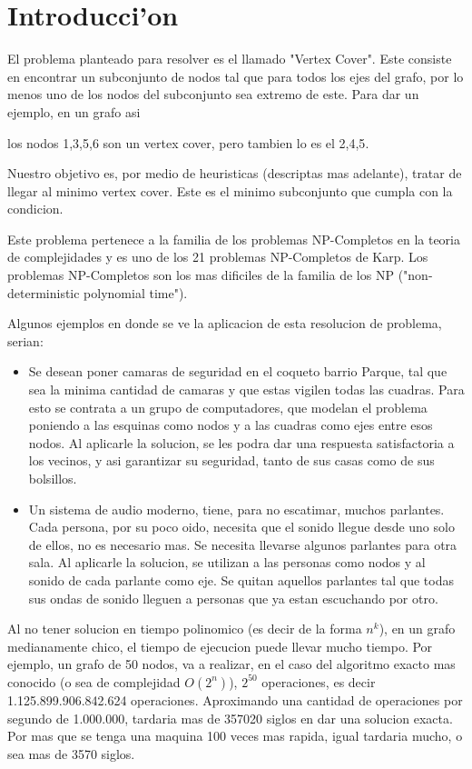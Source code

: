 \section{Introducci'on}
El problema planteado para resolver es el llamado "Vertex Cover". Este consiste en encontrar un subconjunto de nodos tal que para todos los ejes del grafo,
por lo menos uno de los nodos del subconjunto sea extremo de este.
Para dar un ejemplo, en un grafo asi


los nodos {1,3,5,6} son un vertex cover, pero tambien lo es el {2,4,5}.

Nuestro objetivo es, por medio de heuristicas (descriptas mas adelante), tratar de llegar al minimo vertex cover. Este es el minimo subconjunto que cumpla
con la condicion.

Este problema pertenece a la familia de los problemas NP-Completos en la teoria de complejidades y es uno de los 21 problemas NP-Completos de Karp. Los
problemas NP-Completos son los mas dificiles de la familia de los NP ("non-deterministic polynomial time").

Algunos ejemplos en donde se ve la aplicacion de esta resolucion de problema, serian:

\begin{itemize}
\item Se desean poner camaras de seguridad en el coqueto barrio Parque, tal que sea la minima cantidad de camaras y que estas vigilen todas las cuadras.
Para esto se contrata a un grupo de computadores, que modelan el problema poniendo a las esquinas como nodos y a las cuadras como ejes entre esos nodos.
Al aplicarle la solucion, se les podra dar una respuesta satisfactoria a los vecinos, y asi garantizar su seguridad, tanto de sus casas como de sus bolsillos.
\item Un sistema de audio moderno, tiene, para no escatimar, muchos parlantes. Cada persona, por su poco oido, necesita que el sonido llegue desde uno solo de ellos, no es necesario mas. Se necesita llevarse algunos parlantes para otra sala. Al aplicarle la solucion, se utilizan a las personas como nodos y al sonido de cada parlante como eje. Se quitan aquellos parlantes tal que todas sus ondas de sonido lleguen a personas que ya estan escuchando por otro.

\end{itemize}

Al no tener solucion en tiempo polinomico (es decir de la forma $n^k$), en un grafo medianamente chico, el tiempo de ejecucion puede llevar mucho tiempo.
Por ejemplo, un grafo de 50 nodos, va a realizar, en el caso del algoritmo exacto mas conocido (o sea de complejidad $O(2^n)$), $2^{50}$ operaciones, es decir
1.125.899.906.842.624 operaciones. Aproximando una cantidad de operaciones por segundo de 1.000.000, tardaria mas de 357020 siglos en dar una solucion exacta.
Por mas que se tenga una maquina 100 veces mas rapida, igual tardaria mucho, o sea mas de 3570 siglos.	

